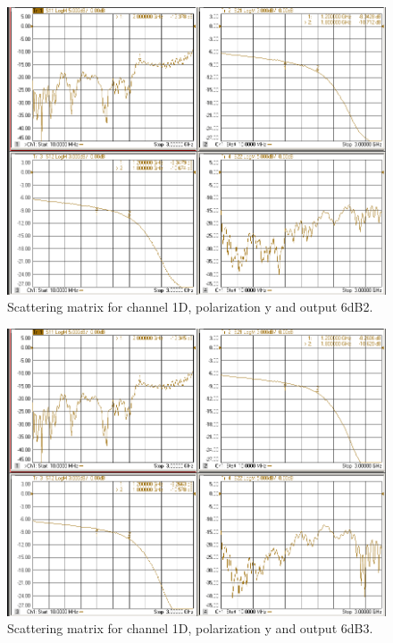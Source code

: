 \documentclass[12pt,a4paper,oneside]{article}
\begin{document}
\begin{figure}[H]
\centering
\includegraphics[width=0.9\linewidth]{VNA_results/1Dy_6dB2.png}
\caption{Scattering matrix for channel 1D, polarization y and output 6dB2.}
\label{fig:1Dy_6dB2}
\end{figure}


\begin{figure}[H]
\centering
\includegraphics[width=0.9\linewidth]{VNA_results/1Dy_6dB3.png}
\caption{Scattering matrix for channel 1D, polarization y and output 6dB3.}
\label{fig:1Dy_6dB3}
\end{figure}
\end{document}
